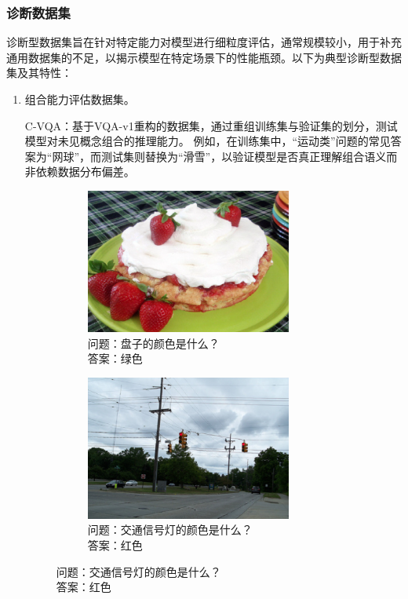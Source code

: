 \subsubsection{诊断数据集}
诊断型数据集旨在针对特定能力对模型进行细粒度评估，通常规模较小，用于补充通用数据集的不足，以揭示模型在特定场景下的性能瓶颈。以下为典型诊断型数据集及其特性：
\begin{enumerate}[itemsep=0pt,parsep=0pt]
    \item 组合能力评估数据集。

​C-VQA\cite{agrawal2017c}：基于VQA-v1重构的数据集，通过重组训练集与验证集的划分，测试模型对未见概念组合的推理能力。
例如，在训练集中，“运动类”问题的常见答案为“网球”，而测试集则替换为“滑雪”，以验证模型是否真正理解组合语义而非依赖数据分布偏差。

\begin{figure}
    \centering
    
    \begin{subfigure}[b]{0.45\textwidth}
        \centering
        \includegraphics[width=0.8\textwidth]{figures/CVQA-A.png}
        \caption*{问题：盘子的颜色是什么？\\答案：绿色}
    \end{subfigure}
    \hfill
    \begin{subfigure}[b]{0.45\textwidth}
        \centering
        \includegraphics[width=0.8\textwidth]{figures/CVQA-B.png}
        \caption*{问题：交通信号灯的颜色是什么？\\答案：红色}
    \end{subfigure}


\end{figure}
\end{enumerate}
